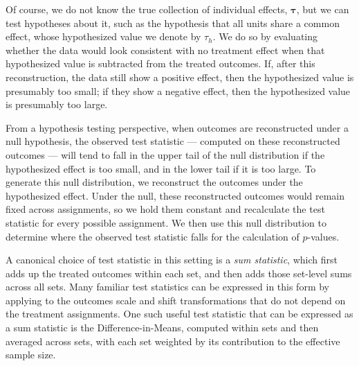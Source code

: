 \documentclass[
  12pt,
  leqno]{article}
\begin{document}
Of course, we do not know the true collection of individual effects,
\(\bm{\tau}\), but we can test hypotheses about it, such as the
hypothesis that all units share a common effect, whose hypothesized
value we denote by \(\tau_h\). We do so by evaluating whether the data
would look consistent with no treatment effect when that hypothesized
value is subtracted from the treated outcomes. If, after this
reconstruction, the data still show a positive effect, then the
hypothesized value is presumably too small; if they show a negative
effect, then the hypothesized value is presumably too large.

From a hypothesis testing perspective, when outcomes are reconstructed
under a null hypothesis, the observed test statistic --- computed on
these reconstructed outcomes --- will tend to fall in the upper tail of
the null distribution if the hypothesized effect is too small, and in
the lower tail if it is too large. To generate this null distribution,
we reconstruct the outcomes under the hypothesized effect. Under the
null, these reconstructed outcomes would remain fixed across
assignments, so we hold them constant and recalculate the test statistic
for every possible assignment. We then use this null distribution to
determine where the observed test statistic falls for the calculation of
\(p\)-values.

A canonical choice of test statistic in this setting is a \emph{sum
statistic}, which first adds up the treated outcomes within each set,
and then adds those set-level sums across all sets. Many familiar test
statistics can be expressed in this form by applying to the outcomes
scale and shift transformations that do not depend on the treatment
assignments. One such useful test statistic that can be expressed as a
sum statistic is the Difference-in-Means, computed within sets and then
averaged across sets, with each set weighted by its contribution to the
effective sample size.
\end{document}
